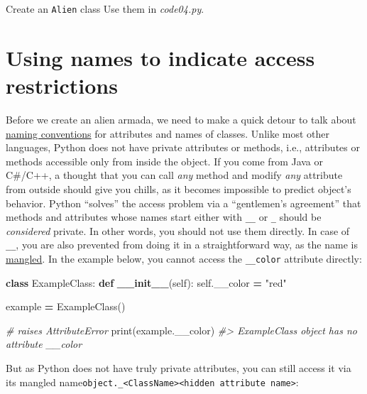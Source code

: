 \documentclass[
]{book}
\newenvironment{Shaded}{\begin{snugshade}}{\end{snugshade}}
\newcommand{\BuiltInTok}[1]{#1}
\newcommand{\CommentTok}[1]{\textcolor[rgb]{0.56,0.35,0.01}{\textit{#1}}}
\newcommand{\FunctionTok}[1]{\textcolor[rgb]{0.13,0.29,0.53}{\textbf{#1}}}
\newcommand{\KeywordTok}[1]{\textcolor[rgb]{0.13,0.29,0.53}{\textbf{#1}}}
\newcommand{\NormalTok}[1]{#1}
\newcommand{\OperatorTok}[1]{\textcolor[rgb]{0.81,0.36,0.00}{\textbf{#1}}}
\newcommand{\StringTok}[1]{\textcolor[rgb]{0.31,0.60,0.02}{#1}}
\newcommand{\VariableTok}[1]{\textcolor[rgb]{0.00,0.00,0.00}{#1}}
\begin{document}
Create an \texttt{Alien} class
Use them in \emph{code04.py}.

\hypertarget{using-names-to-indicate-access-restrictions}{%
\section{Using names to indicate access restrictions}\label{using-names-to-indicate-access-restrictions}}

Before we create an alien armada, we need to make a quick detour to talk about \href{https://peps.python.org/pep-0008}{naming conventions} for attributes and names of classes. Unlike most other languages, Python does not have private attributes or methods, i.e., attributes or methods accessible only from inside the object. If you come from Java or C\#/C++, a thought that you can call \emph{any} method and modify \emph{any} attribute from outside should give you chills, as it becomes impossible to predict object's behavior. Python ``solves'' the access problem via a ``gentlemen's agreement'' that methods and attributes whose names start either with \texttt{\_\_} or \texttt{\_} should be \emph{considered} private. In other words, you should not use them directly. In case of \texttt{\_\_}, you are also prevented from doing it in a straightforward way, as the name is \href{https://peps.python.org/pep-0008/\#descriptive-naming-styles}{mangled}. In the example below, you cannot access the \texttt{\_\_color} attribute directly:

\begin{Shaded}
\begin{Highlighting}[]
\KeywordTok{class}\NormalTok{ ExampleClass:}
  \KeywordTok{def} \FunctionTok{\_\_init\_\_}\NormalTok{(}\VariableTok{self}\NormalTok{):}
    \VariableTok{self}\NormalTok{.\_\_color }\OperatorTok{=} \StringTok{"red"}

\NormalTok{example }\OperatorTok{=}\NormalTok{ ExampleClass()}

\CommentTok{\# raises AttributeError}
\BuiltInTok{print}\NormalTok{(example.\_\_color)}
\CommentTok{\#\textgreater{} \textquotesingle{}ExampleClass\textquotesingle{} object has no attribute \textquotesingle{}\_\_color\textquotesingle{}}
\end{Highlighting}
\end{Shaded}

But as Python does not have truly private attributes, you can still access it via its mangled name\texttt{object.\_\textless{}ClassName\textgreater{}\textless{}hidden\ attribute\ name\textgreater{}}:
\end{document}

